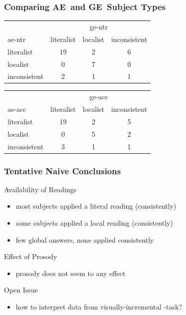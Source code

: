 \documentclass[fleqn,10pt,serif,xcolor=dvipsnames]{beamer}
\renewcommand{\AE}{AE\xspace}
\newcommand{\GE}{GE\xspace}
\begin{document}
\begin{frame}
  \frametitle{Comparing \AE\ and \GE\ Subject Types}

  \begin{center}
    \begin{tabular}{lccc}
      & \multicolumn{3}{c}{ge-ntr} \\ \cmidrule(r){2-4}
      ae-ntr & literalist & localist & inconsistent \\ \midrule
      literalist   & 19 & 2 & 6\\
      localist     &  0 & 7 & 0 \\
      inconsistent &  2 & 1 & 1\\
    \end{tabular}
  \end{center}

  \medskip

  \begin{center}
    \begin{tabular}{lccc}
      & \multicolumn{3}{c}{ge-acc} \\ \cmidrule(r){2-4}
      ae-acc & literalist & localist & inconsistent \\ \midrule
      literalist   & 19 & 2 & 5\\
      localist     &  0 & 5 & 2 \\
      inconsistent &  3 & 1 & 1\\
    \end{tabular}
  \end{center}

\end{frame}


\begin{frame}
  \frametitle{Tentative Naive Conclusions}
  
  \begin{block}{Availability of Readings}
    \begin{itemize}
    \item most subjects applied a literal reading (consistently)
    \item some subjects applied a local reading (consistently)
    \item few global answers, none applied consistently
    \end{itemize}
  \end{block}

  \begin{block}{Effect of Prosody}
    \begin{itemize}
    \item prosody does not seem to any effect
    \end{itemize}
  \end{block}

  \begin{block}{Open Issue}
    \begin{itemize}
    \item how to interpret data from visually-incremental
      -task?
    \end{itemize}

  \end{block}
\end{frame}
\end{document}
